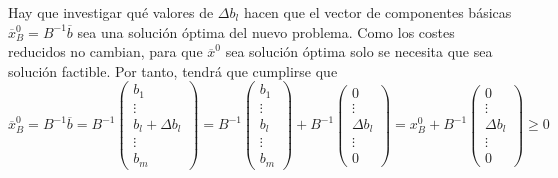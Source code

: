 \documentclass[11pt]{report}
\theoremstyle{mytheorem}
\theoremstyle{mydefinition}
\theoremstyle{myexample}
\begin{document}
Hay que investigar qué valores de $\Delta b_l$ hacen que el vector de componentes básicas $\overline{x}^0_B = B^{-1}\overline{b}$ sea una solución óptima del nuevo problema. Como los costes reducidos no cambian, para que $\overline{x}^0$ sea solución óptima solo se necesita que sea solución factible. Por tanto, tendrá que cumplirse que
\[\overline{x}^0_B = B^{-1}\overline{b} = B^{-1}\begin{pmatrix}
    b_1 \\
    \vdots \\
    b_l+\Delta b_l \\
    \vdots \\
    b_m
\end{pmatrix} = B^{-1}\begin{pmatrix}
    b_1 \\
    \vdots \\
    b_l \\
    \vdots \\
    b_m
\end{pmatrix}+B^{-1}\begin{pmatrix}
    0 \\
    \vdots \\
    \Delta b_l \\
    \vdots \\
    0
\end{pmatrix} = x^0_B + B^{-1}\begin{pmatrix}
    0 \\
    \vdots \\
    \Delta b_l \\
    \vdots \\
    0
\end{pmatrix} \geq 0\]
\end{document}
